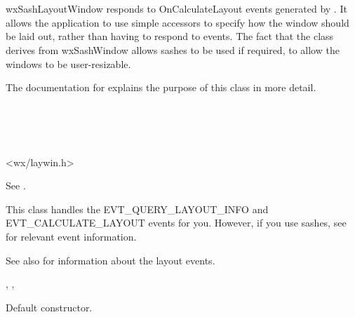 \section{}\label{wxsashlayoutwindow}

wxSashLayoutWindow responds to OnCalculateLayout events generated
by . It allows the
application to use simple accessors to specify how the window should be
laid out, rather than having to respond to events. The fact that
the class derives from wxSashWindow allows sashes to be used if required,
to allow the windows to be user-resizable.

The documentation for  explains
the purpose of this class in more detail.


\\
\\
\\


<wx/laywin.h>




See .


This class handles the EVT\_QUERY\_LAYOUT\_INFO and EVT\_CALCULATE\_LAYOUT events
for you. However, if you use sashes, see  for
relevant event information.

See also  for information
about the layout events.


, , 


\label{wxsashlayoutwindowctor}


Default constructor.

